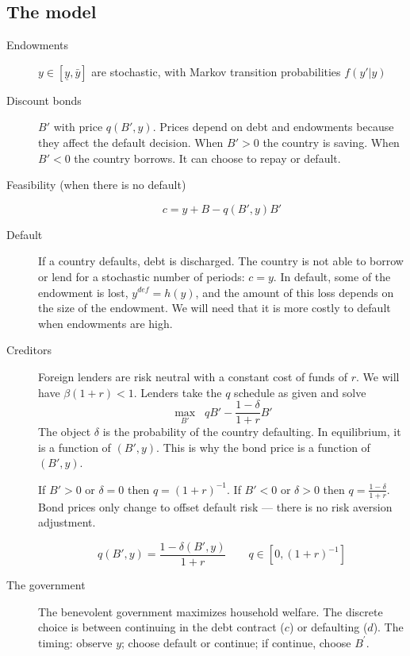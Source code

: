 \documentclass[11pt, pdftex]{article}
\begin{document}
\subsection{The model}

\begin{description}
    \item[Endowments] $y \in [\underline{y}, \bar{y}]$ are stochastic, with Markov transition probabilities $f\left(y'|y \right)$

    \item[Discount bonds] $B'$ with price $q\left(B',y \right)$.  Prices depend on debt and endowments because they affect the default decision. When $B'>0$ the country is saving.  When $B'<0$ the country borrows.  It can choose to repay or default.
    \item[Feasibility (when there is no default)]
    \begin{equation}\label{eq:feas}
        c=y+B-q\left(B',y \right)B'
   \end{equation}

    \item[Default] If a country defaults, debt is discharged.  The country is not able to borrow or lend for a stochastic number of periods: $c=y$.  In default, some of the endowment is lost, $y^{def}=h(y)$, and the amount of this loss depends on the size of the endowment.  We will need that it is more costly to default when endowments are high.

    \item[Creditors] Foreign lenders are risk neutral with a constant cost of funds of $r$. We will have $\beta(1+r)<1$.  Lenders take the $q$ schedule as given and solve
        \[
        \max_{B'} \;\; qB' - \frac{1-\delta}{1+r}B'
        \]
        The object $\delta$ is the probability of the country defaulting.  In equilibrium, it is a function of $(B',y)$.  This is why the bond price is a function of $(B',y)$.

        If $B'>0$ or $\delta = 0$ then $q = \left(1+r \right)^{-1}$. If $B'<0$ or $\delta > 0$ then $q = \frac{1-\delta}{1+r}$.  Bond prices only change to offset default risk --- there is no risk aversion adjustment.

        \[ q(B',y) = \frac{1-\delta\left(B',y \right)}{1+r} \qquad q \in [0,(1+r)^{-1}]
        \]

    \item [The government] The benevolent government maximizes household welfare. The discrete choice is between continuing in the debt contract ($c$) or defaulting ($d$). The timing: observe $y$; choose default or continue; if continue, choose $B^\prime$.


\end{description}
\end{document}
